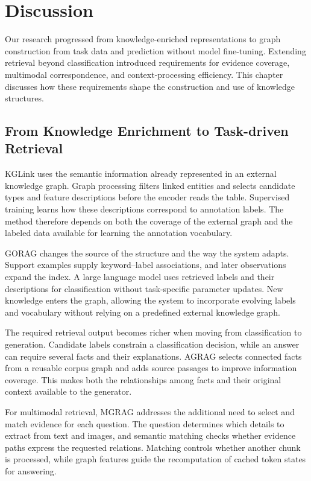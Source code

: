 \chapter{Discussion}
\label{ch:discussion}

Our research progressed from knowledge-enriched representations to graph construction from task data and prediction without model fine-tuning. Extending retrieval beyond classification introduced requirements for evidence coverage, multimodal correspondence, and context-processing efficiency. This chapter discusses how these requirements shape the construction and use of knowledge structures.

\section{From Knowledge Enrichment to Task-driven Retrieval}
\label{sec:discussion:pipeline}
KGLink uses the semantic information already represented in an external knowledge graph. Graph processing filters linked entities and selects candidate types and feature descriptions before the encoder reads the table. Supervised training learns how these descriptions correspond to annotation labels. The method therefore depends on both the coverage of the external graph and the labeled data available for learning the annotation vocabulary.

GORAG changes the source of the structure and the way the system adapts. Support examples supply keyword--label associations, and later observations expand the index. A large language model uses retrieved labels and their descriptions for classification without task-specific parameter updates. New knowledge enters the graph, allowing the system to incorporate evolving labels and vocabulary without relying on a predefined external knowledge graph.

The required retrieval output becomes richer when moving from classification to generation. Candidate labels constrain a classification decision, while an answer can require several facts and their explanations. AGRAG selects connected facts from a reusable corpus graph and adds source passages to improve information coverage. This makes both the relationships among facts and their original context available to the generator.

\begin{samepage}
For multimodal retrieval, MGRAG addresses the additional need to select and match evidence for each question. The question determines which details to extract from text and images, and semantic matching checks whether evidence paths express the requested relations. Matching controls whether another chunk is processed, while graph features guide the recomputation of cached token states for answering.\par
\end{samepage}

